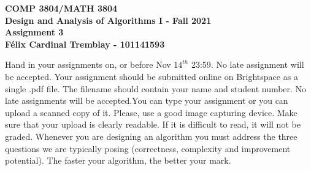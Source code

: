 \documentclass[12pt]{article}
\newcounter{ques}
\begin{document}
\begin{center} \large\bf
COMP 3804/MATH 3804\\
Design and Analysis of Algorithms I  -
Fall  2021\\
Assignment 3\\
Félix Cardinal Tremblay - 101141593
\end{center}

Hand in your assignments on, or before
Nov $14^{th}$ 23:59. No late assignment will be accepted. Your assignment should be submitted online on Brightspace as a single .pdf file.  The filename should contain your name and student number. No late assignments will be accepted.You can type your assignment or you can upload a scanned copy of it.  Please, use a good image capturing device. Make sure that your upload is clearly readable. If it is difficult to read, it will not be graded. Whenever you are designing an algorithm you must address the three questions we are
typically posing (correctness, complexity and improvement potential).
The faster your
algorithm, the better your mark.     \\

\vspace{1em}
\end{document}

